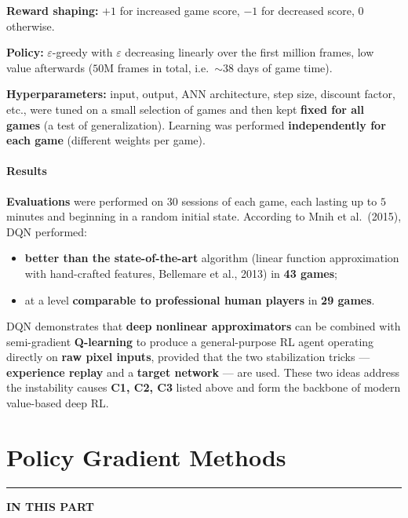 \documentclass[11pt,a4paper]{article}
\theoremstyle{definition}
\theoremstyle{plain}
\theoremstyle{remark}
\newcommand{\partmtoc}{%
  \vspace{2pt}%
  {\color{rlrule}\rule{\linewidth}{0.5pt}}\par\vspace{3pt}%
  {\footnotesize\bfseries\color{rlaccent}IN THIS PART}\par\vspace{2pt}%
  \begingroup
  \etocsetnexttocdepth{subsection}%
  \localtableofcontents
  \endgroup
  \vspace{2pt}{\color{rlrule}\rule{\linewidth}{0.5pt}}\par\vspace{10pt}}
\begin{document}
\textbf{Reward shaping:} $+1$ for increased game score, $-1$ for decreased score, $0$ otherwise.

\textbf{Policy:} $\varepsilon$-greedy with $\varepsilon$ decreasing linearly over the first million frames, low value afterwards ($50$M frames in total, i.e.\ $\sim 38$ days of game time).

\textbf{Hyperparameters:} input, output, ANN architecture, step size, discount factor, etc., were tuned on a small selection of games and then kept \textbf{fixed for all games} (a test of generalization). Learning was performed \textbf{independently for each game} (different weights per game).

\subsection{Results}

\textbf{Evaluations} were performed on $30$ sessions of each game, each lasting up to $5$ minutes and beginning in a random initial state. According to Mnih et al.\ (2015), DQN performed:
\begin{itemize}
    \item \textbf{better than the state-of-the-art} algorithm (linear function approximation with hand-crafted features, Bellemare et al., 2013) in \textbf{43 games};
    \item at a level \textbf{comparable to professional human players} in \textbf{29 games}.
\end{itemize}

\begin{tcolorbox}[colback=yellow!10!white, colframe=orange!80!black, title={Take-Away}]
DQN demonstrates that \textbf{deep nonlinear approximators} can be combined with semi-gradient \textbf{Q-learning} to produce a general-purpose RL agent operating directly on \textbf{raw pixel inputs}, provided that the two stabilization tricks — \textbf{experience replay} and a \textbf{target network} — are used. These two ideas address the instability causes \textbf{C1, C2, C3} listed above and form the backbone of modern value-based deep RL.
\end{tcolorbox}

\part{Policy Gradient Methods}
\partmtoc
\end{document}
